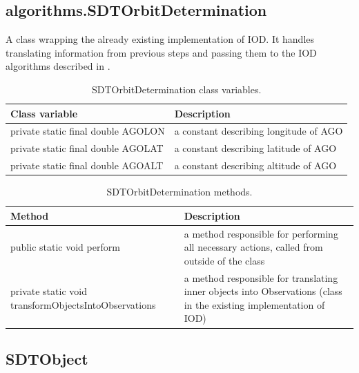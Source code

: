 \newpage

\subsection{algorithms.SDTOrbitDetermination}

	A class wrapping the already existing implementation of IOD. It handles translating information from previous steps and passing them to the IOD algorithms described in .
	
\begin{table}[H]
\centering
\setlength{\extrarowheight}{2pt}
\begin{tabularx}{\textwidth}{|X|X|}
\hline
\textbf{Class variable} & \textbf{Description} \\ \hline
private static final double \mbox{AGOLON} & a constant describing longitude of AGO \\ \hline
private static final double \mbox{AGOLAT} & a constant describing latitude of AGO\\ \hline
private static final double \mbox{AGOALT} & a constant describing altitude of AGO\\ \hline
\end{tabularx}
\caption{SDTOrbitDetermination class variables.}
\label{tab:class_variables_OD}
\end{table}

\begin{table}[H]
\centering
\setlength{\extrarowheight}{2pt}
\begin{tabularx}{\textwidth}{|X|X|}
\hline
\textbf{Method} & \textbf{Description} \\ \hline
public static void \mbox{perform} & a method responsible for performing all necessary actions, called from outside of the class \\ \hline
private static void \mbox{transformObjectsIntoObservations} & a method responsible for translating inner objects into Observations (class in the existing implementation of IOD)\\ \hline
\end{tabularx}
\caption{SDTOrbitDetermination methods.}
\label{tab:class_methods_OD}
\end{table}

\newpage

\subsection{SDTObject}\label{subsec:object}

